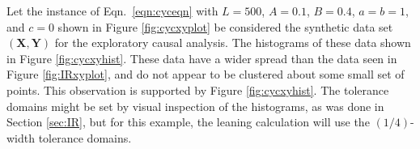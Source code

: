 Let the instance of Eqn.\ \ref{eqn:cyceqn} with $L=500$, $A=0.1$, $B=0.4$, $a=b=1$, and $c=0$ shown in Figure \ref{fig:cycxyplot} be considered the synthetic data set $(\mathbf{X},\mathbf{Y})$ for the exploratory causal analysis.  The histograms of these data shown in Figure \ref{fig:cycxyhist}.  These data have a wider spread than the data seen in Figure \ref{fig:IRxyplot}, and do not appear to be clustered about some small set of points.  This observation is supported by Figure \ref{fig:cycxyhist}.  The tolerance domains might be set by visual inspection of the histograms, as was done in Section \ref{sec:IR}, but for this example, the leaning calculation will use the $(1/4)$-width tolerance domains.
